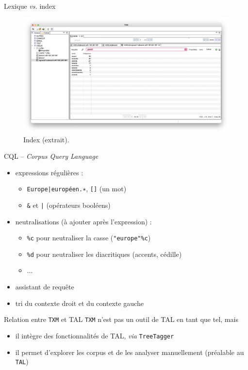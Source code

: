 \documentclass[xetex,xcolor={table,usenames,dvipsnames}]{beamer}
\begin{document}
\begin{frame}{Lexique \textit{vs.} index}
	\begin{figure}[h] %
		\centering
		\includegraphics[width=1\linewidth]{img/index.png}
		\caption{Index (extrait).}
		\label{fig:ling_out_TAL}
	\end{figure}
\end{frame}

\begin{frame}{\textsc{CQL} -- \textit{Corpus Query Language}}
	\begin{itemize}
		\item expressions régulières : 
		\begin{itemize}
		\item \texttt{Europe|européen.∗}, \texttt{[]} (un mot)
		\item \texttt{\&} et \texttt{|} (opérateurs booléens)
		\end{itemize}
		\item neutralisations (à ajouter après l’expression) :
		\begin{itemize}
			\item \texttt{\%c} pour neutraliser la casse (\texttt{"europe"\%c})
			\item \texttt{\%d} pour neutraliser les diacritiques (accents, cédille)
			\item $\dots$
		\end{itemize}
		\item assistant de requête
		\item tri du contexte droit et du contexte gauche
	\end{itemize}
\end{frame}

\begin{frame}{Relation entre \texttt{TXM} et \textsc{TAL}}
	\texttt{TXM} n’est pas un outil de \textsc{TAL} en tant que tel, mais 
	\begin{itemize}
		\item il intègre des fonctionnalités de \textsc{TAL}, \textit{via} \texttt{TreeTagger}
		\item il permet d’explorer les corpus et de les analyser manuellement (préalable au \texttt{TAL})
	\end{itemize}
\end{frame}
\end{document}
